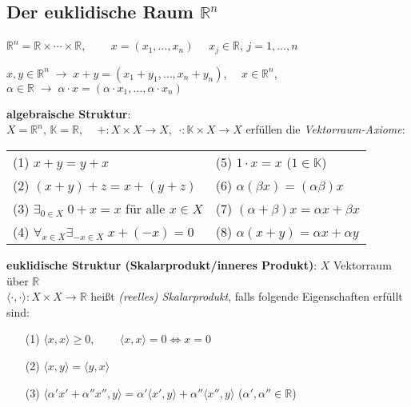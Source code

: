 \subsection{%
    \texorpdfstring{Der euklidische Raum $\mathbb{R}^n$}%
    {Der euklidische Raum ℝⁿ}%
}

$\mathbb{R}^n = \mathbb{R} \times \cdots \times \mathbb{R}$,
$\qquad x = (x_1, \ldots, x_n) \quad$ $x_j \in \mathbb{R}$,
$j = 1, \ldots, n$

$x, y \in \mathbb{R}^n \;\rightarrow\; x + y = (x_1 + y_1, \ldots, x_n + y_n)$,
$\quad x \in \mathbb{R}^n$, $\alpha \in \mathbb{R} \;\rightarrow\;
\alpha \cdot x = (\alpha \cdot x_1, \ldots, \alpha \cdot x_n)$

\textbf{algebraische Struktur}: \\
$X = \mathbb{R}^n$, $\mathbb{K} = \mathbb{R}$,
$\quad \boldsymbol{+}: X \times X \rightarrow X$, $\;\boldsymbol{\cdot}:
\mathbb{K} \times X \rightarrow X$
erfüllen die \emph{Vektorraum-Axiome}:

\begin{tabular}{p{8cm}p{8cm}}
    (1) $x + y = y + x$ &
    (5) $1 \cdot x = x$ ($1 \in \mathbb{K}$) \\
    (2) $(x + y) + z = x + (y + z)$ &
    (6) $\alpha (\beta x) = (\alpha \beta) x$ \\
    (3) $\exists_{0 \in X}\; 0 + x = x$ für alle $x \in X$ &
    (7) $(\alpha + \beta) x = \alpha x + \beta x$ \\
    (4) $\forall_{x \in X} \exists_{-x \in X}\; x + (-x) = 0$ &
    (8) $\alpha (x + y) = \alpha x + \alpha y$
\end{tabular}

\vspace{12pt}
\linie

\textbf{euklidische Struktur (Skalarprodukt/inneres Produkt)}:
$X$ Vektorraum über $\mathbb{R}$ \\
$\langle \cdot, \cdot \rangle:
X \times X \rightarrow \mathbb{R}$ heißt \emph{(reelles) Skalarprodukt}, falls
folgende Eigenschaften erfüllt sind:

\begin{itemize}
    \item[(1)] $\langle x, x \rangle \ge 0$,
    $\qquad \langle x, x \rangle = 0 \Leftrightarrow x = 0$

    \item[(2)] $\langle x, y \rangle = \langle y, x \rangle$

    \item[(3)] $\langle \alpha' x' + \alpha'' x'', y \rangle =
    \alpha' \langle x', y \rangle + \alpha'' \langle x'', y \rangle$
    \qquad ($\alpha', \alpha'' \in \mathbb{R}$)
\end{itemize}

